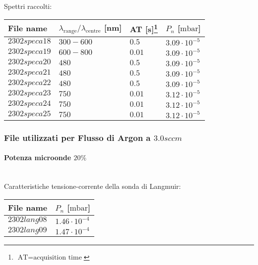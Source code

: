 Spettri raccolti:
\begin{center}
\begin{tabular}{p{3cm}p{4cm}p{2cm}p{3cm}}
\toprule
File name	&$\lambda_\text{range}\text{/}\lambda_\text{centre}$ [nm] 	&AT [s]\footnote{$\text{AT}=\text{acquisition time}$} &$P_n$ [$\si{\milli\bar}$]\\
\midrule
$2302speca18$	&$300-600$	&$0.5$		&$3.09\cdot10^{-5}$\\
$2302speca19$	&$600-800$	&$0.01$		&$3.09\cdot10^{-5}$\\
$2302speca20$	&$480$		&$0.5$		&$3.09\cdot10^{-5}$\\
$2302speca21$	&$480$		&$0.5$		&$3.09\cdot10^{-5}$\\
$2302speca22$	&$480$		&$0.5$		&$3.09\cdot10^{-5}$\\
$2302speca23$	&$750$		&$0.01$		&$3.12\cdot10^{-5}$\\
$2302speca24$	&$750$		&$0.01$		&$3.12\cdot10^{-5}$\\
$2302speca25$	&$750$		&$0.01$		&$3.12\cdot10^{-5}$\\
\bottomrule
\end{tabular}
\end{center}



\subsubsection{File utilizzati per Flusso di Argon a $3.0sccm$}

\paragraph*{Potenza microonde $\text{20\%}$} ~\\
Caratteristiche tensione-corrente della sonda di Langmuir:
\begin{center}
\begin{tabular}{p{3cm}p{3cm}}
\toprule
File name	&$P_{n}$ [$\si{\milli\bar}$]\\
\midrule
$2302lang08$	&$1.46\cdot10^{-4}$\\
$2302lang09$	&$1.47\cdot10^{-4}$\\
\bottomrule
\end{tabular}
\end{center}

